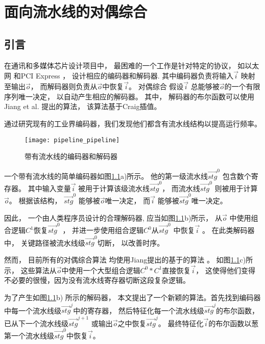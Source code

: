 \chapter{面向流水线的对偶综合}
\label{chap:5}

\section{引言}
在通讯和多媒体芯片设计项目中，
最困难的一个工作是针对特定的协议，
如以太网\cite{IEEE8023_S4} 和PCI Express \cite{pcie21}，
设计相应的编码器和解码器.
其中编码器负责将输入$\vec{i}$ 映射至输出$\vec{o}$，
而解码器则负责从$\vec{o}$中恢复$\vec{i}$。
对偶综合\cite{ShenICCAD09,ShenTCAD11,ShenTCAD12,LiuICCAD11,LiuTCAD12,TuDAC13}
假设$\vec{i}$ 总能够被$\vec{o}$的一个有限序列唯一决定，
以自动产生相应的解码器。
其中，
解码器的布尔函数可以使用Jiang et al. \cite{InterpBoolFunction}提出的算法，
该算法基于Craig插值\cite{Craig}。

通过研究现有的工业界编码器，我们发现他们都含有流水线结构以提高运行频率。
\begin{figure}[t]
\begin{center}
\texttt{[image: pipeline\_pipeline]}
\end{center}
  \label{fig_pipe}
\caption{带有流水线的编码器和解码器}
\end{figure}

一个带有流水线的简单编码器如图\ref{fig_pipe}a)所示。
他的第一级流水线$\vec{stg}^0$ 包含数个寄存器。
其中输入变量$\vec{i}$ 被用于计算该级流水线$\vec{stg}^0$，
而流水线$\vec{stg}^0$ 则被用于计算$\vec{o}$。
根据该结构，
$\vec{stg}^0$ 能够被$\vec{o}$唯一决定，
而$\vec{i}$ 能够被$\vec{stg}^0$唯一决定。

因此，
一个由人类程序员设计的合理解码器,
应当如图\ref{fig_pipe}b)所示，
从$\vec{o}$ 中使用组合逻辑$C^1$恢复$\vec{stg}^0$ ，
并进一步使用组合逻辑$C^0$从$\vec{stg}^0$ 中恢复$\vec{i}$ 。
在此类解码器中，
关键路径被流水线级$\vec{stg}^0$切断，
以改善时序。



然而，
目前所有的对偶综合算法\cite{ShenTCAD11,ShenTCAD12,LiuICCAD11,LiuTCAD12,TuDAC13}
均使用Jiang提出的基于\cite{Craig}的算法 \cite{InterpBoolFunction}。
如图\ref{fig_pipe}c)所示，
这些算法从$\vec{o}$中使用一个大型组合逻辑$C^0*C^1$直接恢复$\vec{i}$，
这使得他们变得不必要的很慢，因为没有流水线寄存器切断这段复杂逻辑。

为了产生如图\ref{fig_pipe}b) 所示的解码器，
本文提出了一个新颖的算法。首先找到编码器中每一个流水线级$\vec{stg}^j$中的寄存器，
然后特征化每一个流水线级$\vec{stg}^j$的布尔函数，
已从下一个流水线级$\vec{stg}^{j+1}$ 或输出$\vec{o}$之中恢复$\vec{stg}^j$。
最终特征化$\vec{i}$的布尔函数以葱
第一个流水线级$\vec{stg}^0$中恢复$\vec{i}$。

